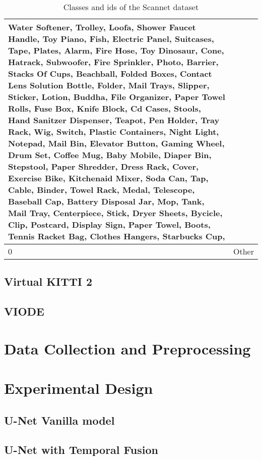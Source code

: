 \begin{table}
\begin{center}
\begin{tabular}{ | l | p{17cm} |}
Water Softener, Trolley, Loofa, Shower Faucet Handle, Toy Piano, Fish, Electric Panel, Suitcases, Tape, Plates, Alarm, Fire Hose, Toy Dinosaur, Cone, Hatrack, Subwoofer, Fire Sprinkler, Photo, Barrier, Stacks Of Cups, Beachball, Folded Boxes, Contact Lens Solution Bottle, Folder, Mail Trays, Slipper, Sticker, Lotion, Buddha, File Organizer, Paper Towel Rolls, Fuse Box, Knife Block, Cd Cases, Stools, Hand Sanitzer Dispenser, Teapot, Pen Holder, Tray Rack, Wig, Switch, Plastic Containers, Night Light, Notepad, Mail Bin, Elevator Button, Gaming Wheel, Drum Set, Coffee Mug, Baby Mobile, Diaper Bin, Stepstool, Paper Shredder, Dress Rack, Cover, Exercise Bike, Kitchenaid Mixer, Soda Can, Tap, Cable, Binder, Towel Rack, Medal, Telescope, Baseball Cap, Battery Disposal Jar, Mop, Tank, Mail Tray, Centerpiece, Stick, Dryer Sheets, Bycicle, Clip, Postcard, Display Sign, Paper Towel, Boots, Tennis Racket Bag, Clothes Hangers, Starbucks Cup, \\ \hline
			
			0 & Other \\ \hline
			\hline
			
			
		\end{tabular}
		\caption{Classes and ids of the Scannet dataset}
		\label{table:Classes in scannet_3}
	\end{center}
	\end{table}

    \subsection{Virtual KITTI 2}
    \subsection{VIODE}
	
	\section{Data Collection and Preprocessing}
    \section{Experimental Design}
    \subsection{U-Net Vanilla model}
    \subsection{U-Net with Temporal Fusion}

